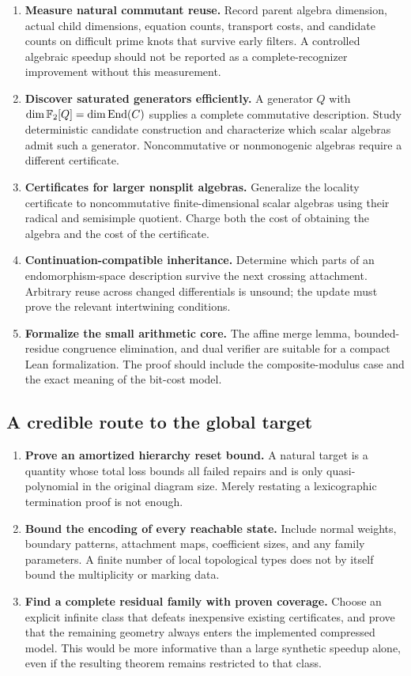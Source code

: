 \begin{enumerate}[resume]
\item \textbf{Measure natural commutant reuse.} Record parent algebra
dimension, actual child dimensions, equation counts, transport costs,
and candidate counts on difficult prime knots that survive early
filters. A controlled algebraic speedup should not be reported as a
complete-recognizer improvement without this measurement.
\item \textbf{Discover saturated generators efficiently.} A generator
$Q$ with $\dim\mathbb F_2[Q]=\dim\operatorname{End}(C)$ supplies a complete commutative
description. Study deterministic candidate construction and characterize
which scalar algebras admit such a generator. Noncommutative or
nonmonogenic algebras require a different certificate.
\item \textbf{Certificates for larger nonsplit algebras.} Generalize the
locality certificate to noncommutative finite-dimensional scalar
algebras using their radical and semisimple quotient. Charge both the
cost of obtaining the algebra and the cost of the certificate.
\item \textbf{Continuation-compatible inheritance.} Determine which
parts of an endomorphism-space description survive the next crossing
attachment. Arbitrary reuse across changed differentials is unsound;
the update must prove the relevant intertwining conditions.
\item \textbf{Formalize the small arithmetic core.} The affine merge lemma,
bounded-residue congruence elimination, and dual verifier are suitable
for a compact Lean formalization. The proof should include the
composite-modulus case and the exact meaning of the bit-cost model.
\end{enumerate}

\subsection{A credible route to the global target}

\begin{enumerate}[resume]
\item \textbf{Prove an amortized hierarchy reset bound.} A natural target
is a quantity whose total loss bounds all failed repairs and is only
quasi-polynomial in the original diagram size. Merely restating a
lexicographic termination proof is not enough.
\item \textbf{Bound the encoding of every reachable state.} Include
normal weights, boundary patterns, attachment maps, coefficient sizes,
and any family parameters. A finite number of local topological types
does not by itself bound the multiplicity or marking data.
\item \textbf{Find a complete residual family with proven coverage.}
Choose an explicit infinite class that defeats inexpensive existing
certificates, and prove that the remaining geometry always enters the
implemented compressed model. This would be more informative than a
large synthetic speedup alone, even if the resulting theorem remains
restricted to that class.
\end{enumerate}

